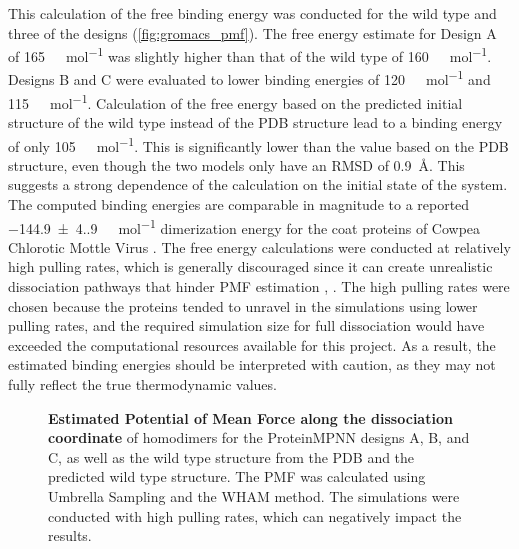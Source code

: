This calculation of the free binding energy was conducted for the wild type and three of the designs (\autoref{fig:gromacs_pmf}). The free energy estimate for Design A of \SI{165}{\kilo\cal\per\mole} was slightly higher than that of the wild type of \SI{160}{\kilo\cal\per\mole}. Designs B and C were evaluated to lower binding energies of \SI{120}{\kilo\cal\per\mole} and \SI{115}{\kilo\cal\per\mole}. Calculation of the free energy based on the predicted initial structure of the wild type instead of the PDB structure lead to a binding energy of only \SI{105}{\kilo\cal\per\mole}. This is significantly lower than the value based on the PDB structure, even though the two models only have an RMSD of \SI{0.9}{\angstrom}. This suggests a strong dependence of the calculation on the initial state of the system. The computed binding energies are comparable in magnitude to a reported \SI[separate-uncertainty=true]{-144.9(4.9)}{\kilo\cal\per\mole} dimerization energy for the coat proteins of Cowpea Chlorotic Mottle Virus \cite{ccmv_binding_energy}. The free energy calculations were conducted at relatively high pulling rates, which is generally discouraged since it can create unrealistic dissociation pathways that hinder PMF estimation \cite{lemkul_umbrella_sampling}, \cite{umbrella_sampling_problems}. The high pulling rates were chosen because the proteins tended to unravel in the simulations using lower pulling rates, and the required simulation size for full dissociation would have exceeded the computational resources available for this project. As a result, the estimated binding energies should be interpreted with caution, as they may not fully reflect the true thermodynamic values.

\begin{figure}
    
    \caption{\textbf{Estimated Potential of Mean Force along the dissociation coordinate} of homodimers for the ProteinMPNN designs A, B, and C, as well as the wild type structure from the PDB and the predicted wild type structure. The PMF was calculated using Umbrella Sampling and the WHAM method. The simulations were conducted with high pulling rates, which can negatively impact the results. }
    \label{fig:gromacs_pmf}
\end{figure}

